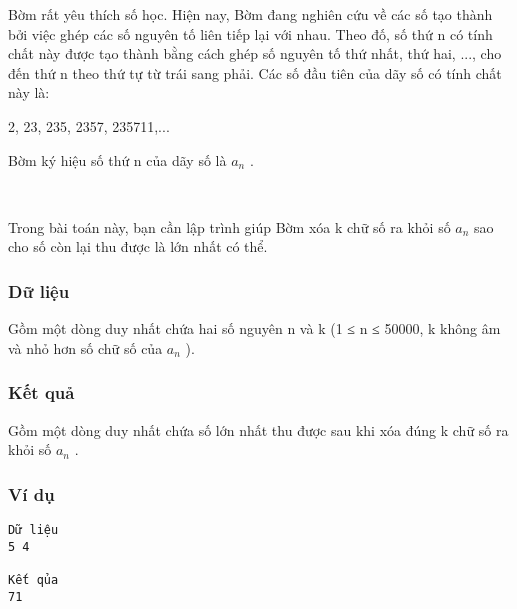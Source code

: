 

Bờm rất yêu thích số học. Hiện nay, Bờm đang nghiên cứu về các số tạo thành bởi việc ghép các số nguyên tố liên tiếp lại với nhau. Theo đố, số thứ n có tính chất này được tạo thành bằng cách ghép số nguyên tố thứ nhất, thứ hai, ..., cho đến thứ n theo thứ tự từ trái sang phải. Các số đầu tiên của dãy số có tính chất này là:

2, 23, 235, 2357, 235711,...

Bờm ký hiệu số thứ n của dãy số là $a_{n}$ .

 

Trong bài toán này, bạn cần lập trình giúp Bờm xóa k chữ số ra khỏi số $a_{n}$ sao cho số còn lại thu được là lớn nhất có thể.

\subsubsection{Dữ liệu}

Gồm một dòng duy nhất chứa hai số nguyên n và k (1 ≤ n ≤ 50000, k không âm và nhỏ hơn số chữ số của $a_{n}$ ).

\subsubsection{Kết quả}

Gồm một dòng duy nhất chứa số lớn nhất thu được sau khi xóa đúng k chữ số ra khỏi số $a_{n}$ .

\subsubsection{Ví dụ}
\begin{verbatim}
Dữ liệu
5 4

Kết qủa
71
\end{verbatim}
